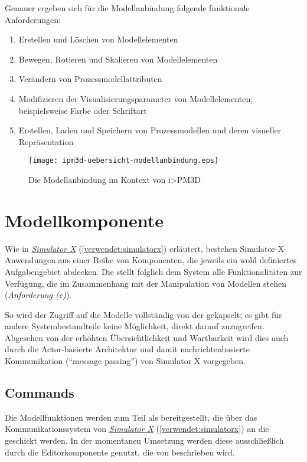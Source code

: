 \documentclass[a4paper,10pt]{sphinxmanual}
\begin{document}
Genauer ergeben sich für die Modellanbindung folgende funktionale Anforderungen:
\begin{enumerate}
\item {} 
Erstellen und Löschen von Modellelementen

\item {} 
Bewegen, Rotieren und Skalieren von Modellelementen

\item {} 
Verändern von Prozessmodellattributen

\item {} 
Modifizieren der Visualisierungsparameter von Modellelementen; beispielsweise Farbe oder Schriftart

\item {} 
Erstellen, Laden und Speichern von Prozessmodellen und deren visueller Repräsentation

\end{enumerate}
\begin{figure}[htbp]
\centering
\capstart

\texttt{[image: ipm3d-uebersicht-modellanbindung.eps]}
\caption{Die Modellanbindung im Kontext von i\textgreater{}PM3D}\label{modellanbindung:ipm3d-uebersicht-modellanbindung}\end{figure}


\section{Modellkomponente}
\label{modellanbindung:modellkomponente}\label{modellanbindung:id2}
Wie in {\hyperref[verwendet:simulatorx]{\emph{Simulator X}}} (\autoref*{verwendet:simulatorx}) erläutert, bestehen Simulator-X-Anwendungen aus einer Reihe von Komponenten, die jeweils ein wohl definiertes Aufgabengebiet abdecken.
Die  stellt folglich dem System alle Funktionalitäten zur Verfügung, die im Zusammenhang mit der Manipulation von Modellen stehen (\emph{Anforderung (e)}).

So wird der Zugriff auf die Modelle vollständig von der  gekapselt; es gibt für andere Systembestandteile keine Möglichkeit, direkt darauf zuzugreifen.
Abgesehen von der erhöhten Übersichtlichkeit und Wartbarkeit wird dies auch durch die Actor-basierte Architektur und damit nachrichtenbasierte Kommunikation ("`message passing"') von Simulator X vorgegeben.


\subsection{Commands}
\label{modellanbindung:commands}
Die Modellfunktionen werden zum Teil als  bereitgestellt, die über das Kommunikationssystem von {\hyperref[verwendet:simulatorx]{\emph{Simulator X}}} (\autoref*{verwendet:simulatorx}) an die  geschickt werden.
In der momentanen Umsetzung werden diese  ausschließlich durch die Editorkomponente genutzt, die von \cite{uli} beschrieben wird.
\end{document}
